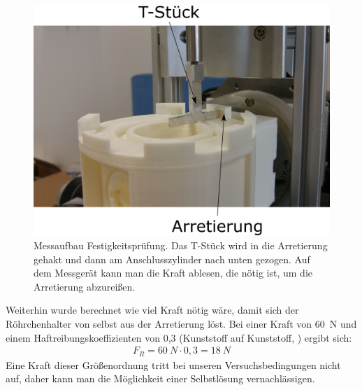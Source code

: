 \begin{figure}[h!]
	\begin{center}
		\includegraphics[scale=0.7]{Messmethode_Zugkraft.png}
		\caption[Messaufbau Arretierung 2]{Messaufbau Festigkeitsprüfung. Das T-Stück wird in die Arretierung gehakt und dann am Anschlusszylinder nach unten gezogen. Auf dem Messgerät kann man die Kraft ablesen, die nötig ist, um die Arretierung abzureißen.}
	\end{center}
\end{figure}

Weiterhin wurde berechnet wie viel Kraft nötig wäre, damit sich der Röhrchenhalter von selbst aus der Arretierung löst. Bei einer Kraft von \SI{60}{N} und einem Haftreibungskoeffizienten von 0,3 (Kunststoff auf Kunststoff, \cite{Schumann2011}) ergibt sich:
\begin{align*}
F_R = \SI{60}{N} \cdot 0,3 = \SI{18}{N}
\end{align*}
Eine Kraft dieser Größenordnung tritt bei unseren Versuchsbedingungen nicht auf, daher kann man die Möglichkeit einer Selbstlösung vernachlässigen.

\newpage

